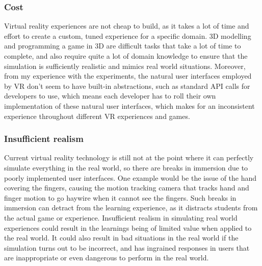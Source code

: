 \documentclass[11pt]{article}
\begin{document}
\subsubsection{Cost}
\label{sec:orgaf02245}
Virtual reality experiences are not cheap to build, as it takes a lot of time and effort to create a custom, tuned experience for a specific domain. 3D modelling and programming a game in 3D are difficult tasks that take a lot of time to complete, and also require quite a lot of domain knowledge to ensure that the simulation is sufficiently realistic and mimics real world situations. Moreover, from my experience with the experiments, the natural user interfaces employed by VR don't seem to have built-in abstractions, such as standard API calls for developers to use, which means each developer has to roll their own implementation of these natural user interfaces, which makes for an inconsistent experience throughout different VR experiences and games.
\subsubsection{Insufficient realism}
\label{sec:org1cd5c5e}
Current virtual reality technology is still not at the point where it can perfectly simulate everything in the real world, so there are breaks in immersion due to poorly implemented user interfaces. One example would be the issue of the hand covering the fingers, causing the motion tracking camera that tracks hand and finger motion to go haywire when it cannot see the fingers. Such breaks in immersion can detract from the learning experience, as it distracts students from the actual game or experience. Insufficient realism in simulating real world experiences could result in the learnings being of limited value when applied to the real world. It could also result in bad situations in the real world if the simulation turns out to be incorrect, and has ingrained responses in users that are inappropriate or even dangerous to perform in the real world.

 \newpage
\end{document}
